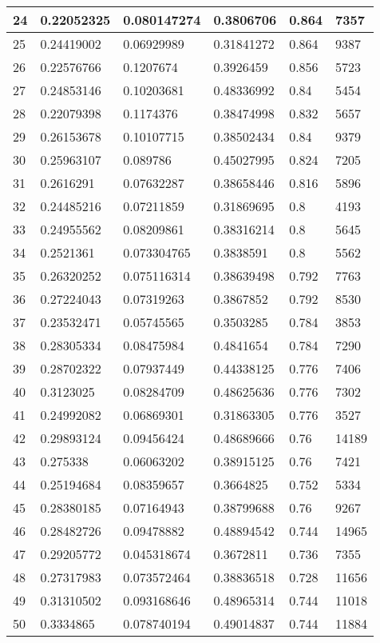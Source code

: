 \begin{longtable}{|l|l|l|l|l|l|}
24 & 0.22052325 & 0.080147274 & 0.3806706 & 0.864 & 7357 \\ \hline 
25 & 0.24419002 & 0.06929989 & 0.31841272 & 0.864 & 9387 \\ \hline 
26 & 0.22576766 & 0.1207674 & 0.3926459 & 0.856 & 5723 \\ \hline 
27 & 0.24853146 & 0.10203681 & 0.48336992 & 0.84 & 5454 \\ \hline 
28 & 0.22079398 & 0.1174376 & 0.38474998 & 0.832 & 5657 \\ \hline 
29 & 0.26153678 & 0.10107715 & 0.38502434 & 0.84 & 9379 \\ \hline 
30 & 0.25963107 & 0.089786 & 0.45027995 & 0.824 & 7205 \\ \hline 
31 & 0.2616291 & 0.07632287 & 0.38658446 & 0.816 & 5896 \\ \hline 
32 & 0.24485216 & 0.07211859 & 0.31869695 & 0.8 & 4193 \\ \hline 
33 & 0.24955562 & 0.08209861 & 0.38316214 & 0.8 & 5645 \\ \hline 
34 & 0.2521361 & 0.073304765 & 0.3838591 & 0.8 & 5562 \\ \hline 
35 & 0.26320252 & 0.075116314 & 0.38639498 & 0.792 & 7763 \\ \hline 
36 & 0.27224043 & 0.07319263 & 0.3867852 & 0.792 & 8530 \\ \hline 
37 & 0.23532471 & 0.05745565 & 0.3503285 & 0.784 & 3853 \\ \hline 
38 & 0.28305334 & 0.08475984 & 0.4841654 & 0.784 & 7290 \\ \hline 
39 & 0.28702322 & 0.07937449 & 0.44338125 & 0.776 & 7406 \\ \hline 
40 & 0.3123025 & 0.08284709 & 0.48625636 & 0.776 & 7302 \\ \hline 
41 & 0.24992082 & 0.06869301 & 0.31863305 & 0.776 & 3527 \\ \hline 
42 & 0.29893124 & 0.09456424 & 0.48689666 & 0.76 & 14189 \\ \hline 
43 & 0.275338 & 0.06063202 & 0.38915125 & 0.76 & 7421 \\ \hline 
44 & 0.25194684 & 0.08359657 & 0.3664825 & 0.752 & 5334 \\ \hline 
45 & 0.28380185 & 0.07164943 & 0.38799688 & 0.76 & 9267 \\ \hline 
46 & 0.28482726 & 0.09478882 & 0.48894542 & 0.744 & 14965 \\ \hline 
47 & 0.29205772 & 0.045318674 & 0.3672811 & 0.736 & 7355 \\ \hline 
48 & 0.27317983 & 0.073572464 & 0.38836518 & 0.728 & 11656 \\ \hline 
49 & 0.31310502 & 0.093168646 & 0.48965314 & 0.744 & 11018 \\ \hline 
50 & 0.3334865 & 0.078740194 & 0.49014837 & 0.744 & 11884 \\ \hline 
\end{longtable}